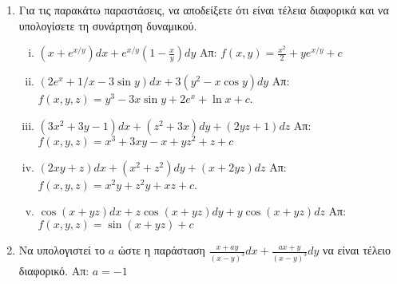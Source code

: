 \begin{enumerate}
  \item Για τις παρακάτω παραστάσεις, να αποδείξετε ότι είναι τέλεια διαφορικά και 
    να υπολογίσετε τη συνάρτηση δυναμικού.
    \begin{enumerate}[i)]
      \item $ \left(x+e^{x/y}\right)dx + e^{x/y}\left(1- \frac{x}{y}\right)dy $
        \hfill Απ: $ f(x,y) = \frac{x^{2}}{2} +y e^{x/y} + c $ 

      \item $\left(2e^{x}+{1}/{x}-3\sin y\right)dx+3(y^2-x\cos y)dy$ 
        \hfill  Απ: $ f(x,y,z) = y^{3}-3x \sin{y} + 2e^{x} + \ln{x} +c $.
      \item $ (3x^{2}+3y-1)dx + (z^{2}+3x)dy+(2yz+1)dz $
        \hfill Απ: $ f(x,y,z) = x^{3}+3xy-x+yz^{2}+z+c $

      \item $(2xy+z)dx+(x^{2}+z^{2})dy+(x+2yz)dz$ 
        \hfill  Απ: $ f(x,y,z) = x^{2}y+z^{2}y+xz +c $.

      \item $ \cos(x+yz)dx + z\cos(x+yz)dy+y\cos(x+yz)dz $
        \hfill Απ: $ f(x,y,z) = \sin(x+yz) + c $

    \end{enumerate}

  \item Να υπολογιστεί το $a$ ώστε η παράσταση $ \frac{ x + ay }{ (x-y)^{3} }dx 
    + \frac{ ax+y }{ (x-y)^{3} }dy $ να είναι τέλειο διαφορικό.
    \hfill Απ: $ a=-1 $

\end{enumerate}



